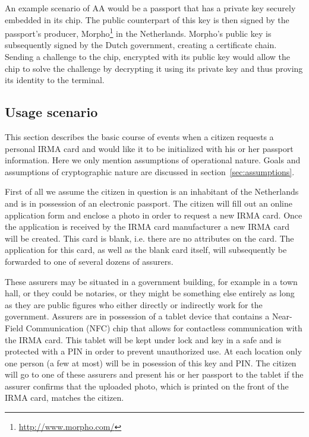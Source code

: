 An example scenario of AA would be a passport that has a private key securely embedded in its chip. The public counterpart of this key is then signed by the passport's producer, Morpho\footnote{\url{http://www.morpho.com/}} in the Netherlands. Morpho's public key is subsequently signed by the Dutch government, creating a certificate chain. Sending a challenge to the chip, encrypted with its public key would allow the chip to solve the challenge by decrypting it using its private key and thus proving its identity to the terminal.

\subsection{Usage scenario}
\label{subsec:bcoe}
This section describes the basic course of events when a citizen requests a personal IRMA card and would like it to be initialized with his or her passport information. Here we only mention assumptions of operational nature. Goals and assumptions of cryptographic nature are discussed in section~\ref{sec:assumptions}. 

First of all we assume the citizen in question is an inhabitant of the Netherlands and is in possession of an electronic passport. The citizen will fill out an online application form and enclose a photo in order to request a new IRMA card. Once the application is received by the IRMA card manufacturer a new IRMA card will be created. This card is blank, i.e. there are no attributes on the card. The application for this card, as well as the blank card itself, will subsequently be forwarded to one of several dozens of assurers. 

These assurers may be situated in a government building, for example in a town hall, or they could be notaries, or they might be something else entirely as long as they are public figures who either directly or indirectly work for the government. Assurers are in possession of a tablet device that contains a Near-Field Communication (NFC) chip that allows for contactless communication with the IRMA card. This tablet will be kept under lock and key in a safe and is protected with a PIN in order to prevent unauthorized use. At each location only one person (a few at most) will be in posession of this key and PIN. The citizen will go to one of these assurers and present his or her passport to the tablet if the assurer confirms that the uploaded photo, which is printed on the front of the IRMA card, matches the citizen. 

